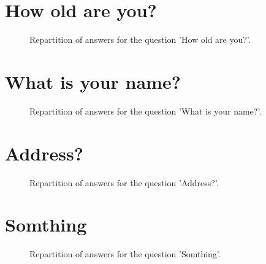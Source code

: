 \documentclass[12pt]{article}
\date{February 23, 2019}
\begin{document}
\clearpage{}
\section{How old are you?}

\label{sec:1}


\begin{figure}[h!]
    \caption{\label{figure:q1-1}Repartition of answers for the question 'How old are you?'.}
\end{figure}



\clearpage{}
\section{What is your name?}

\label{sec:2}


\begin{figure}[h!]
    \caption{\label{figure:q2-1}Repartition of answers for the question 'What is your name?'.}
\end{figure}



\clearpage{}
\section{Address?}

\label{sec:3}


\begin{figure}[h!]
    \caption{\label{figure:q3-1}Repartition of answers for the question 'Address?'.}
\end{figure}



\clearpage{}
\section{Somthing}

\label{sec:4}


\begin{figure}[h!]
    \caption{\label{figure:q4-1}Repartition of answers for the question 'Somthing'.}
\end{figure}
\end{document}
